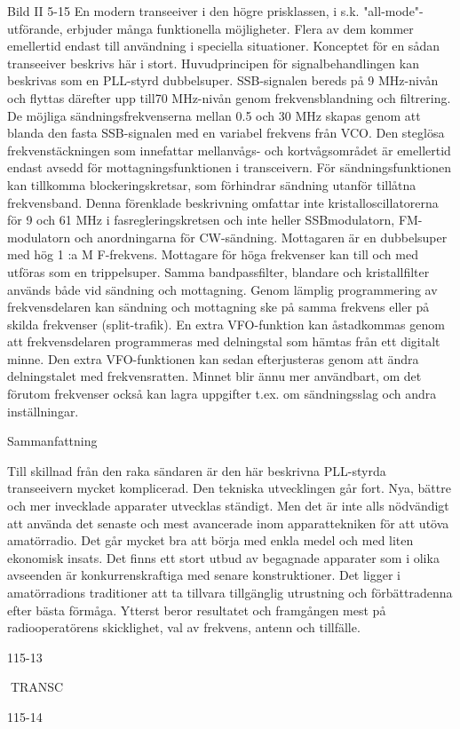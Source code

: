 Bild II 5-15
En modern transeeiver i den högre prisklassen, i s.k. "all-mode"-utförande, erbjuder många funktionella möjligheter. Flera av
dem kommer emellertid endast till användning i speciella situationer. Konceptet
för en sådan transeeiver beskrivs här i stort.
Huvudprincipen för signalbehandlingen kan
beskrivas som en PLL-styrd dubbelsuper.
SSB-signalen bereds på 9 MHz-nivån och
flyttas därefter upp till70 MHz-nivån genom
frekvensblandning och filtrering. De möjliga
sändningsfrekvenserna mellan 0.5 och 30
MHz skapas genom att blanda den fasta
SSB-signalen med en variabel frekvens från
VCO. Den steglösa frekvenstäckningen som
innefattar mellanvågs- och kortvågsområdet är emellertid endast avsedd för mottagningsfunktionen i transceivern. För sändningsfunktionen kan tillkomma blockeringskretsar, som förhindrar sändning utanför
tillåtna frekvensband.
Denna förenklade beskrivning omfattar
inte kristalloscillatorerna för 9 och 61 MHz i
fasregleringskretsen och inte heller SSBmodulatorn, FM-modulatorn och anordningarna för CW-sändning.
Mottagaren är en dubbelsuper med hög
1 :a M F-frekvens. Mottagare för höga frekvenser kan till och med utföras som en
trippelsuper. Samma bandpassfilter, blandare och kristallfilter används både vid sändning och mottagning.
Genom lämplig programmering av
frekvensdelaren kan sändning och mottagning ske på samma frekvens eller på
skilda frekvenser (split-trafik).
En extra VFO-funktion kan åstadkommas genom att frekvensdelaren programmeras med delningstal som hämtas från ett
digitalt minne. Den extra VFO-funktionen
kan sedan efterjusteras genom att ändra
delningstalet med frekvensratten. Minnet
blir ännu mer användbart, om det förutom
frekvenser också kan lagra uppgifter t.ex.
om sändningsslag och andra inställningar.

Sammanfattning

Till skillnad från den raka sändaren är den
här beskrivna PLL-styrda transeeivern
mycket komplicerad. Den tekniska utvecklingen går fort. Nya, bättre och mer invecklade apparater utvecklas ständigt. Men det
är inte alls nödvändigt att använda det senaste och mest avancerade inom apparattekniken för att utöva amatörradio. Det går
mycket bra att börja med enkla medel och
med liten ekonomisk insats.
Det finns ett stort utbud av begagnade
apparater som i olika avseenden är konkurrenskraftiga med senare konstruktioner. Det
ligger i amatörradions traditioner att ta tillvara tillgänglig utrustning och förbättradenna
efter bästa förmåga.
Ytterst beror resultatet och framgången
mest på radiooperatörens skicklighet, val av
frekvens, antenn och tillfälle.

115-13

TRANSC

115-14


